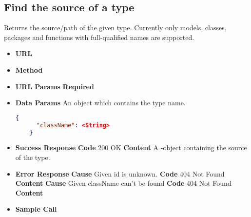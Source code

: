 \subsection{Find the source of a type}
Returns the source/path of the given type.
Currently only models, classes, packages and functions with full-qualified names are supported.
\begin{itemize}
\item \textbf{URL} 
\item \textbf{Method} 

\item \textbf{URL Params}
  \newline\textbf{Required} 

\item \textbf{Data Params} An object which contains the type name.
  \begin{lstlisting}[basicstyle=\small,language=json]
    {
      "className": <String>
    }
  \end{lstlisting}

\item \textbf{Success Response}
  \newline\textbf{Code} 200 OK
  \newline\textbf{Content} A -object containing the source of the type.

\item \textbf{Error Response}
  \newline\textbf{Cause} Given id is unknown.
  \newline\textbf{Code} 404 Not Found
  \newline\textbf{Content} 
  \newline\textbf{Cause} Given className can't be found
  \newline\textbf{Code} 404 Not Found
  \newline\textbf{Content} 

\item \textbf{Sample Call}
\end{itemize}
